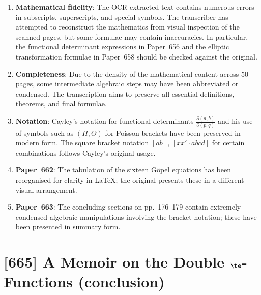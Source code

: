 \documentclass[11pt,a4paper]{book}
\begin{document}
\begin{enumerate}[leftmargin=2em]
\item \textbf{Mathematical fidelity}: The OCR-extracted text contains numerous errors in subscripts, superscripts, and special symbols. The transcriber has attempted to reconstruct the mathematics from visual inspection of the scanned pages, but some formulae may contain inaccuracies. In particular, the functional determinant expressions in Paper~656 and the elliptic transformation formulae in Paper~658 should be checked against the original.

\item \textbf{Completeness}: Due to the density of the mathematical content across 50 pages, some intermediate algebraic steps may have been abbreviated or condensed. The transcription aims to preserve all essential definitions, theorems, and final formulae.

\item \textbf{Notation}: Cayley's notation for functional determinants $\frac{\partial(a, b)}{\partial(p, q)}$ and his use of symbols such as $(H, \Theta)$ for Poisson brackets have been preserved in modern form. The square bracket notation $[ab]$, $[xx' \cdot abcd]$ for certain combinations follows Cayley's original usage.

\item \textbf{Paper~662}: The tabulation of the sixteen G\"{o}pel equations has been reorganised for clarity in \LaTeX; the original presents these in a different visual arrangement.

\item \textbf{Paper~663}: The concluding sections on pp.~176--179 contain extremely condensed algebraic manipulations involving the bracket notation; these have been presented in summary form.
\end{enumerate}
\clearpage



\thispagestyle{fancy}


\newpage

\section{[665] A Memoir on the Double \texorpdfstring{$\te$}{theta}-Functions (conclusion)}
\label{sec:665}
\end{document}
